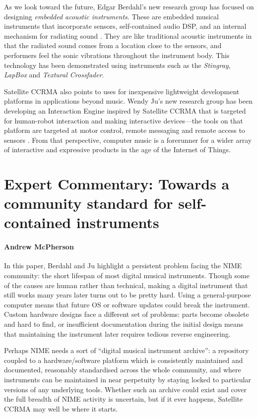 As we look toward the future, Edgar Berdahl's new research group has focused on designing \textit{embedded acoustic
instruments}. These are embedded musical instruments that incorporate sensors, self-contained audio DSP, and an
internal mechanism for radiating sound \cite{Berdahl:2014}. They are like traditional acoustic instruments in that the radiated sound
comes from a location close to the sensors, and performers feel the sonic vibrations throughout the instrument body.
This technology has been demonstrated using instruments such as the\textit{ Stingray}, \textit{LapBox} and
\textit{Textural Crossfader}.

Satellite CCRMA also points to uses for inexpensive lightweight development platforms in applications beyond music.
Wendy Ju's new research group has been developing an Interaction Engine inspired by Satellite CCRMA that is targeted
for human-robot interaction and making interactive devices---the tools on that platform are targeted at motor control,
remote messaging and remote access to sensors \cite{Martelaro:2016}. From that perspective, computer music is a forerunner for a wider
array of interactive and expressive products in the age of the Internet of Things.






\section*{Expert Commentary: Towards a community standard for self-contained instruments}

\paragraph{Andrew McPherson}


In this paper, Berdahl and Ju highlight a persistent problem facing the NIME community: the short lifespan of most digital musical instruments. Though some of the causes are human rather than technical, making a digital instrument that still works many years later turns out to be pretty hard. Using a general-purpose computer means that future OS or software updates could break the instrument. Custom hardware designs face a different set of problems: parts become obsolete and hard to find, or insufficient documentation during the initial design means that maintaining the instrument later requires tedious reverse engineering.

Perhaps NIME needs a sort of ``digital musical instrument archive'': a repository coupled to a hardware/software platform which is consistently maintained and documented, reasonably standardised across the whole community, and where instruments can be maintained in near perpetuity by staying locked to particular versions of any underlying tools. Whether such an archive could exist and cover the full breadth of NIME activity is uncertain, but if it ever happens, Satellite CCRMA may well be where it starts.

